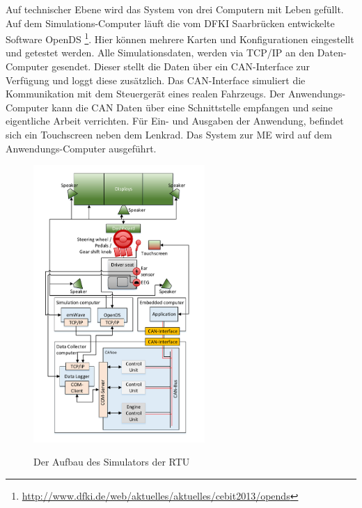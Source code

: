 {Auf technischer Ebene wird das System von drei Computern mit Leben gefüllt. Auf dem Simulations-Computer läuft die vom DFKI Saarbrücken entwickelte Software OpenDS \footnote{\url{http://www.dfki.de/web/aktuelles/aktuelles/cebit2013/opends}}. Hier können mehrere Karten und Konfigurationen eingestellt und getestet werden. 
Alle Simulationsdaten, werden via TCP/IP an den Daten-Computer  gesendet. Dieser stellt die Daten über ein CAN-Interface zur Verfügung und loggt diese zusätzlich. Das CAN-Interface simuliert die Kommunikation mit dem Steuergerät eines realen Fahrzeugs. 
Der Anwendungs-Computer kann die CAN Daten über eine Schnittstelle empfangen und seine eigentliche Arbeit verrichten. Für Ein- und Ausgaben der Anwendung, befindet sich ein Touchscreen neben dem Lenkrad. Das System zur \acl{ME} wird auf dem Anwendungs-Computer ausgeführt.
\begin{figure}[h] 
  \begin{center}
    \includegraphics[width=6.5cm]{img/architecture}
    \label{fig:architecure}
    \caption[Aufbau des Simulators]{Der Aufbau des Simulators der \acl{RTU}}
  \end{center}
\end{figure}

}
